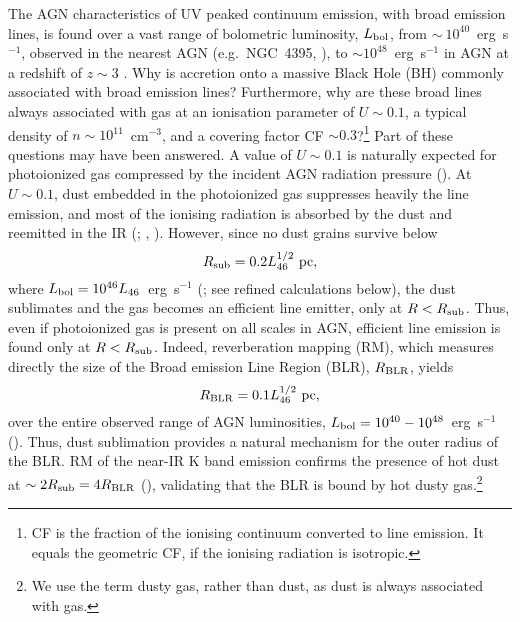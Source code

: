 \documentclass[a4paper,fleqn,usenatbib]{mnras}
\begin{document}
The AGN characteristics of UV peaked continuum emission, with broad emission lines, 
is found over a vast range of bolometric luminosity, $L_{\rm bol}$, from 
$\sim~10^{40}$~erg~s$^{-1}$, observed in the nearest AGN 
(e.g.\ NGC~4395, \citealt{Moran99}), to $\sim 10^{48}$~erg~s$^{-1}$ in AGN at a redshift of $z\sim 3$ \citep{Richards06}. 
Why is accretion onto a massive Black Hole (BH) commonly associated with broad emission lines?
Furthermore, why are these broad lines always associated with gas at an ionisation parameter of $U\sim 0.1$,
a typical density of $n\sim 10^{11}$~cm$^{-3}$, and a covering factor CF $\sim 0.3$?\footnote{CF is the fraction of the ionising continuum converted to line emission. It equals the geometric CF, if the ionising radiation is isotropic.} Part of these questions 
may have been answered. A value of $U\sim 0.1$ is naturally expected for photoionized gas compressed
by the incident AGN radiation pressure (\citealt*{paperII, Stern16}). At $U\sim 0.1$, dust embedded in the 
photoionized gas suppresses heavily
the line emission, and most of the ionising radiation is absorbed by the dust and reemitted in the IR 
(\citealt{LaorDraine93, NetzerLaor93, Ferguson97}; \citealt*{paperI}, \citealt{paperII}). However, 
since no dust grains survive below 
\begin{equation}
R_{\rm sub}=0.2L_{46}^{1/2}~{\rm pc}, 
\end{equation}
where $L_{\rm bol}=10^{46}L_{46}$~erg~s$^{-1}$ (\citealt{LaorDraine93}; see refined calculations below), 
the dust sublimates and the gas becomes an efficient line emitter, only at $R<R_{\rm sub}$. Thus, even if photoionized gas is present on all scales in AGN, 
efficient line emission is found only at $R<R_{\rm sub}$. Indeed, 
reverberation mapping (RM), which measures directly the size of the 
Broad emission Line Region (BLR), $R_{\rm BLR}$, yields 
\begin{equation}
R_{\rm BLR}=0.1L_{46}^{1/2}~{\rm pc}, 
\label{eq:R_BLR}
\end{equation}
over the entire observed range of AGN luminosities, $L_{\rm bol}=10^{40} - 10^{48}$~erg~s$^{-1}$ (\citealt{Kaspi05, Kaspi07}).
Thus, dust sublimation provides a natural mechanism for the outer radius of the BLR.
RM of the near-IR K band emission confirms the presence of hot dust at
$\sim 2R_{\rm sub}=4R_{\rm BLR}$ (\citealt{Suganuma06, Koshida14}), validating that the BLR is bound by hot dusty 
gas.\footnote{We use the term dusty gas, rather than dust, as dust is always associated with gas.} 
\end{document}
